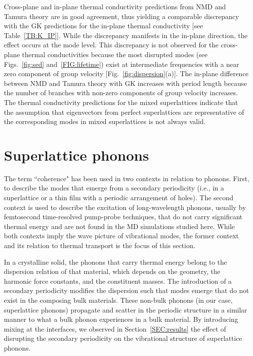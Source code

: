 \documentclass[aps,prb,preprint,preprintnumbers,amsmath,amssymb,floatfix,superscriptaddress]{revtex4}
\begin{document}
Cross-plane and in-plane thermal conductivity predictions from NMD and Tamura theory are in good agreement, thus yielding a comparable discrepancy with the GK predictions for the in-plane thermal conductivity [see Table~\ref{TB:K_IP}]. While the discrepancy manifests in the in-plane direction, the effect occurs at the mode level. This discrepancy is not observed for the cross-plane thermal conductivities because the most disrupted modes (see Figs.~\ref{fig:sed} and~\ref{FIG:lifetime}) exist at intermediate frequencies with a near zero component of group velocity [Fig.~\ref{fig:dispersion}(a)]. The in-plane difference between NMD and Tamura theory with GK increases with period length because the number of branches with non-zero components of group velocity increases. The thermal conductivity predictions for the mixed superlattices indicate that the assumption that eigenvectors from perfect superlattices are representative of the corresponding modes in mixed superlattices is not always valid.

\section{Superlattice phonons}\label{SEC:sl_phon}

The term ``coherence" has been used in two contexts in relation to phonons. First, to describe the modes that emerge from a secondary periodicity (i.e., in a superlattice or a thin film with a periodic arrangement of holes\cite{doi:10.1021/nl102918q,PhysRevB.87.195301}). The second context is used to describe the excitation of long-wavelength phonons, usually by femtosecond time-resolved pump-probe techniques,\cite{PhysRevLett.73.740,PhysRevB.75.195309} that do not carry significant thermal energy and are not found in the MD simulations studied here. While both contexts imply the wave picture of vibrational modes, the former context and its relation to thermal transport is the focus of this section.

In a crystalline solid, the phonons that carry thermal energy belong to the dispersion relation of that material, which depends on the geometry, the harmonic force constants, and the constituent masses. The introduction of a secondary periodicity modifies the dispersion such that modes emerge that do not exist in the composing bulk materials. These non-bulk phonons (in our case, superlattice phonons) propagate and scatter in the periodic structure in a similar manner to what a bulk phonon experiences in a bulk material. By introducing mixing at the interfaces, we observed in Section~\ref{SEC:results} the effect of disrupting the secondary periodicity on the vibrational structure of superlattice phonons. %
\end{document}
